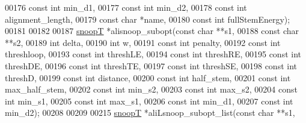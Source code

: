 \begin{DoxyCode}
00176                      \textcolor{keyword}{const} \textcolor{keywordtype}{int}  min\_d1,
00177                      \textcolor{keyword}{const} \textcolor{keywordtype}{int}  min\_d2,
00178                      \textcolor{keyword}{const} \textcolor{keywordtype}{int}  alignment\_length,
00179                      \textcolor{keyword}{const} \textcolor{keywordtype}{char} *name,
00180                      \textcolor{keyword}{const} \textcolor{keywordtype}{int}  fullStemEnergy);
00181 
00182 
00187 \hyperlink{group__data__structures_structsnoopT}{snoopT} *alisnoop\_subopt(\textcolor{keyword}{const} \textcolor{keywordtype}{char}  **s1,
00188                         \textcolor{keyword}{const} \textcolor{keywordtype}{char}  **s2,
00189                         \textcolor{keywordtype}{int}         delta,
00190                         \textcolor{keywordtype}{int}         w,
00191                         \textcolor{keyword}{const} \textcolor{keywordtype}{int}   penalty,
00192                         \textcolor{keyword}{const} \textcolor{keywordtype}{int}   threshloop,
00193                         \textcolor{keyword}{const} \textcolor{keywordtype}{int}   threshLE,
00194                         \textcolor{keyword}{const} \textcolor{keywordtype}{int}   threshRE,
00195                         \textcolor{keyword}{const} \textcolor{keywordtype}{int}   threshDE,
00196                         \textcolor{keyword}{const} \textcolor{keywordtype}{int}   threshTE,
00197                         \textcolor{keyword}{const} \textcolor{keywordtype}{int}   threshSE,
00198                         \textcolor{keyword}{const} \textcolor{keywordtype}{int}   threshD,
00199                         \textcolor{keyword}{const} \textcolor{keywordtype}{int}   distance,
00200                         \textcolor{keyword}{const} \textcolor{keywordtype}{int}   half\_stem,
00201                         \textcolor{keyword}{const} \textcolor{keywordtype}{int}   max\_half\_stem,
00202                         \textcolor{keyword}{const} \textcolor{keywordtype}{int}   min\_s2,
00203                         \textcolor{keyword}{const} \textcolor{keywordtype}{int}   max\_s2,
00204                         \textcolor{keyword}{const} \textcolor{keywordtype}{int}   min\_s1,
00205                         \textcolor{keyword}{const} \textcolor{keywordtype}{int}   max\_s1,
00206                         \textcolor{keyword}{const} \textcolor{keywordtype}{int}   min\_d1,
00207                         \textcolor{keyword}{const} \textcolor{keywordtype}{int}   min\_d2);
00208 
00209 
00215 \hyperlink{group__data__structures_structsnoopT}{snoopT} *aliLsnoop\_subopt\_list(\textcolor{keyword}{const} \textcolor{keywordtype}{char}  **s1,

\end{DoxyCode}
